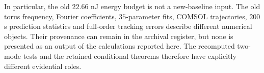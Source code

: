 In particular, the old $22.66$ nJ energy budget is not a new-baseline
input. The old torus frequency, Fourier coefficients, $35$-parameter
fits, COMSOL trajectories, $200$ s prediction statistics and
full-order tracking errors describe different numerical objects.
Their provenance can remain in the archival register, but none is
presented as an output of the calculations reported here. The
recomputed two-mode tests and the retained conditional theorems
therefore have explicitly different evidential roles.
